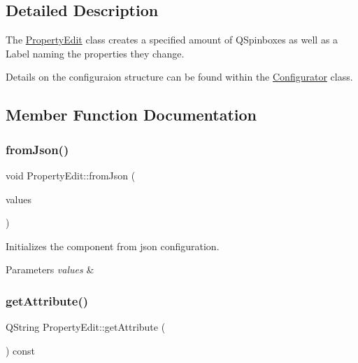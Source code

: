 \subsection{Detailed Description}
The \mbox{\hyperlink{class_property_edit}{Property\+Edit}} class creates a specified amount of Q\+Spinboxes as well as a Label naming the properties they change. 

Details on the configuraion structure can be found within the \mbox{\hyperlink{class_configurator}{Configurator}} class. 

\subsection{Member Function Documentation}
\mbox{\label{class_property_edit_a5c708a29919c4452d7f34321f38a572e}} 
\subsubsection{\texorpdfstring{from\+Json()}{fromJson()}}
{\footnotesize\ttfamily void Property\+Edit\+::from\+Json (\begin{DoxyParamCaption}\item[{const Q\+Json\+Object \&}]{values }\end{DoxyParamCaption})}



Initializes the component from json configuration. 


\begin{DoxyParams}{Parameters}
{\em values} & \\
\hline
\end{DoxyParams}
\mbox{\label{class_property_edit_a44ce9e0c1a30c7d6a2819740613d05c0}} 
\subsubsection{\texorpdfstring{get\+Attribute()}{getAttribute()}}
{\footnotesize\ttfamily Q\+String Property\+Edit\+::get\+Attribute (\begin{DoxyParamCaption}{ }\end{DoxyParamCaption}) const}



